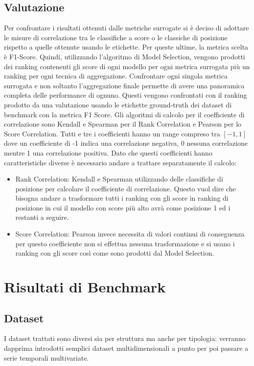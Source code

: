 \subsection{Valutazione}
Per confrontare i risultati ottenuti dalle metriche surrogate si è deciso di adottare le misure di correlazione tra le classifiche a score o le classiche di posizione rispetto a quelle ottenute usando le etichette. Per queste ultime, la metrica scelta è F1-Score.
Quindi, utilizzando l'algoritmo di Model Selection, vengono prodotti dei ranking contenenti gli score di ogni modello per ogni metrica surrogata più un ranking per ogni tecnica di aggregazione. Confrontare ogni singola metrica surrogata e non soltanto l'aggregazione finale permette di avere una panoramica completa delle performance di ognuno.
Questi vengono confrontati con il ranking prodotto da una valutazione usando le etichette ground-truth dei dataset di benchmark con la metrica F1 Score.
Gli algoritmi di calcolo per il coefficiente di correlazione sono Kendall e Spearman per il Rank Correlation e Pearson per lo Score Correlation. Tutti e tre i coefficienti hanno un range compreso tra $[-1,1]$ dove un coefficiente di -1 indica una correlazione negativa, 0 nessuna correlazione mentre 1 una correlazione positiva. 
Dato che questi coefficienti hanno caratteristiche diverse è necessario andare a trattare separatamente il calcolo:
\begin{itemize}
	\item Rank Correlation: Kendall e Spearman utilizzando delle classifiche di posizione per calcolare il coefficiente di correlazione. Questo vuol dire che bisogna andare a trasformare tutti i ranking con gli score in ranking di posizione in cui il modello con score più alto avrà come posizione 1 ed i restanti a seguire.
	\item Score Correlation: Pearson invece necessita di valori continui di conseguenza per questo coefficiente non si effettua nessuna trasformazione e si usano i ranking con gli score così come sono prodotti dal Model Selection.
\end{itemize}

 

\newpage
\section{Risultati di Benchmark}
\subsection{Dataset}
I dataset trattati sono diversi sia per struttura ma anche per tipologia: verranno dapprima introdotti semplici dataset multidimensionali a punto per poi passare a serie temporali multivariate. 

